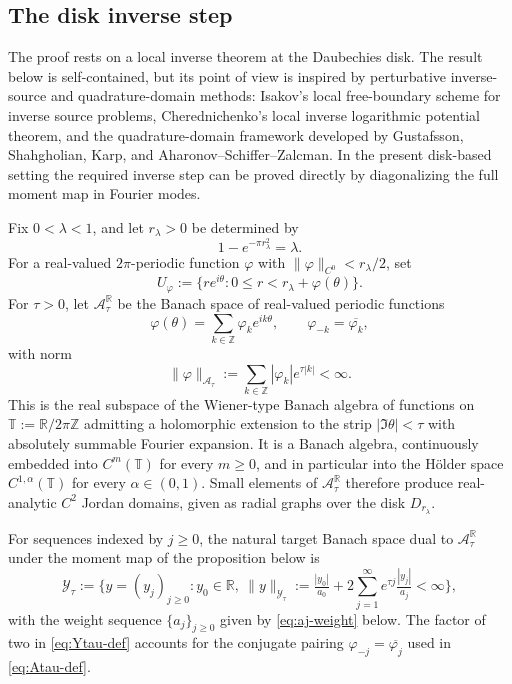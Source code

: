 \documentclass[a4paper,11pt,reqno]{amsart}
\numberwithin{equation}{section}
\theoremstyle{plain} %
\theoremstyle{definition} %
\theoremstyle{remark}
\newcommand{\R}{\mathbb{R}}
\newcommand{\Z}{\mathbb{Z}}
\newcommand{\T}{\mathbb{T}}
\begin{document}
\subsection{The disk inverse step}\label{subsec:disk-inverse-step}

The proof rests on a local inverse theorem at the Daubechies disk. The result
below is self-contained, but its point of view is inspired by perturbative
inverse-source and quadrature-domain methods: Isakov's local free-boundary
scheme for inverse source problems, Cherednichenko's local inverse logarithmic
potential theorem, and the quadrature-domain framework developed by
Gustafsson, Shahgholian, Karp, and Aharonov--Schiffer--Zalcman. In the present
disk-based setting the required inverse step can be proved directly by
diagonalizing the full moment map in Fourier modes.

Fix \(0<\lambda<1\), and let \(r_\lambda>0\) be determined by
\[
1-e^{-\pi r_\lambda^2}=\lambda .
\]
For a real-valued \(2\pi\)-periodic function \(\varphi\) with
\(\|\varphi\|_{C^0}<r_\lambda/2\), set
\[
U_\varphi
:=
\{re^{i\theta}:0\le r<r_\lambda+\varphi(\theta)\}.
\]
For \(\tau>0\), let \(\mathcal A_\tau^\R\) be the Banach space of real-valued
periodic functions
\begin{equation}\label{eq:Atau-def}
\varphi(\theta)=\sum_{k\in\Z}\varphi_k e^{ik\theta},
\qquad
\varphi_{-k}=\overline{\varphi_k},
\end{equation}
with norm
\begin{equation}\label{eq:Atau-norm}
\|\varphi\|_{\mathcal A_\tau}
:=
\sum_{k\in\Z}|\varphi_k|e^{\tau |k|}<\infty .
\end{equation}
This is the real subspace of the Wiener-type Banach algebra of functions on
\(\T:=\R/2\pi\Z\) admitting a holomorphic extension to the strip
\(|\Im\theta|<\tau\) with absolutely summable Fourier expansion. It is a Banach
algebra, continuously embedded into \(C^m(\T)\) for every \(m\ge0\), and in
particular into the H\"older space \(C^{1,\alpha}(\T)\) for every
\(\alpha\in(0,1)\). Small elements of \(\mathcal A_\tau^\R\) therefore produce
real-analytic \(C^2\) Jordan domains, given as radial graphs over the disk
\(D_{r_\lambda}\).

For sequences indexed by \(j\ge0\), the natural target Banach space dual to
\(\mathcal A_\tau^\R\) under the moment map of the proposition below is
\begin{equation}\label{eq:Ytau-def}
\mathcal Y_\tau:=
\Big\{y=(y_j)_{j\ge0}\colon y_0\in\R,\ \|y\|_{\mathcal Y_\tau}
:=\tfrac{|y_0|}{a_0}+2\sum_{j=1}^\infty e^{\tau j}\tfrac{|y_j|}{a_j}<\infty\Big\},
\end{equation}
with the weight sequence \(\{a_j\}_{j\ge0}\) given by \eqref{eq:aj-weight}
below. The factor of two in \eqref{eq:Ytau-def} accounts for the conjugate
pairing \(\varphi_{-j}=\overline{\varphi_j}\) used in \eqref{eq:Atau-def}.
\end{document}
